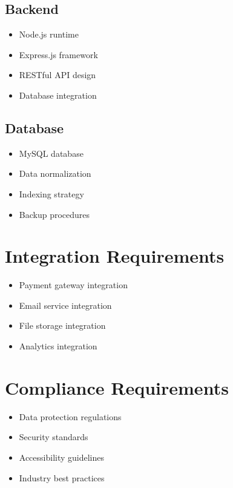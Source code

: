\subsection{Backend}
\begin{itemize}
    \item Node.js runtime
    \item Express.js framework
    \item RESTful API design
    \item Database integration
\end{itemize}

\subsection{Database}
\begin{itemize}
    \item MySQL database
    \item Data normalization
    \item Indexing strategy
    \item Backup procedures
\end{itemize}

\section{Integration Requirements}
\begin{itemize}
    \item Payment gateway integration
    \item Email service integration
    \item File storage integration
    \item Analytics integration
\end{itemize}

\section{Compliance Requirements}
\begin{itemize}
    \item Data protection regulations
    \item Security standards
    \item Accessibility guidelines
    \item Industry best practices
\end{itemize} 